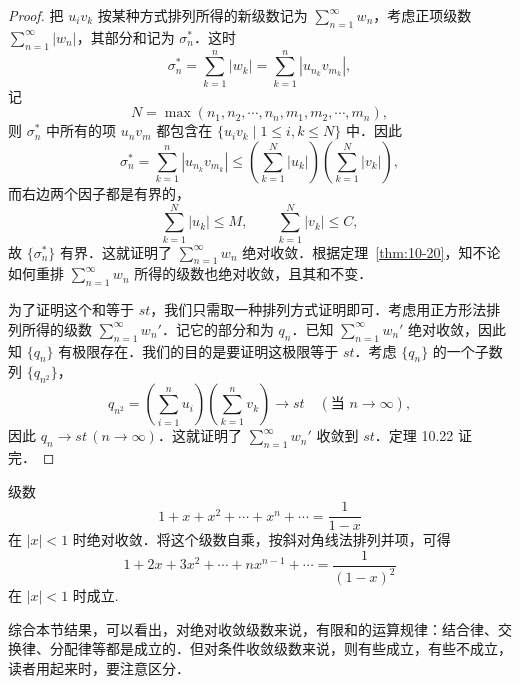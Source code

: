 \begin{proof}
把 $u_{i}v_{k}$ 按某种方式排列所得的新级数记为 $\displaystyle\sum_{n=1}^{\infty}w_{n}$，考虑正项级数 $\sum_{n=1}^{\infty}\left|w_{n}\right|$，其部分和记为 $\sigma_{n}^{*}$．这时
\[
\sigma_{n}^{*}=\sum_{k=1}^{n}\left|w_{k}\right|=\sum_{k=1}^{n}\left|u_{n_{k}}v_{m_{k}}\right|,
\]
记
\[
N=\max\left(n_{1},n_{2},\cdots,n_{n},m_{1},m_{2},\cdots,m_{n}\right),
\]
则 $\sigma_{n}^{*}$ 中所有的项 $u_{n}v_{m}$ 都包含在 $\{u_{i}v_{k}\mid 1\leqslant i,k\leqslant N\}$ 中．因此
\[
\sigma_{n}^{*}=\sum_{k=1}^{n}\left|u_{n_{k}}v_{m_{k}}\right|\leqslant\left(\sum_{k=1}^{N}\left|u_{k}\right|\right)\left(\sum_{k=1}^{N}\left|v_{k}\right|\right),
\]
而右边两个因子都是有界的，
\[
\sum_{k=1}^{N}\left|u_{k}\right|\leqslant M,\qquad\sum_{k=1}^{N}\left|v_{k}\right|\leqslant C,
\]
故 $\{\sigma_{n}^{*}\}$ 有界．这就证明了 $\displaystyle\sum_{n=1}^{\infty}w_{n}$ 绝对收敛．根据定理~\ref{thm:10-20}，知不论如何重排 $\sum_{n=1}^{\infty}w_{n}$ 所得的级数也绝对收敛，且其和不变．

为了证明这个和等于 $st$，我们只需取一种排列方式证明即可．考虑用正方形法排列所得的级数 $\displaystyle\sum_{n=1}^{\infty}w_{n}'$．记它的部分和为 $q_{n}$．已知 $\sum_{n=1}^{\infty}w_{n}'$ 绝对收敛，因此知 $\{q_{n}\}$ 有极限存在．我们的目的是要证明这极限等于 $st$．考虑 $\{q_{n}\}$ 的一个子数列 $\{q_{n^{2}}\}$，
\[
q_{n^{2}}=\left(\sum_{i=1}^{n}u_{i}\right)\left(\sum_{k=1}^{n}v_{k}\right)\to st\quad(\text{当 }n\to\infty),
\]
因此 $q_{n}\to st\,(n\to\infty)$．这就证明了 $\displaystyle\sum_{n=1}^{\infty}w_{n}'$ 收敛到 $st$．定理 10.22 证完．
\end{proof}

\begin{example}\label{ex:10-5-1}
级数
\[
1+x+x^{2}+\cdots+x^{n}+\cdots=\frac{1}{1-x}
\]
在 $|x|<1$ 时绝对收敛．将这个级数自乘，按斜对角线法排列并项，可得
\[
1+2x+3x^{2}+\cdots+nx^{n-1}+\cdots=\frac{1}{(1-x)^{2}}
\]
在 $|x|<1$ 时成立.
\end{example}

综合本节结果，可以看出，对绝对收敛级数来说，有限和的运算规律：结合律、交换律、分配律等都是成立的．但对条件收敛级数来说，则有些成立，有些不成立，读者用起来时，要注意区分．

